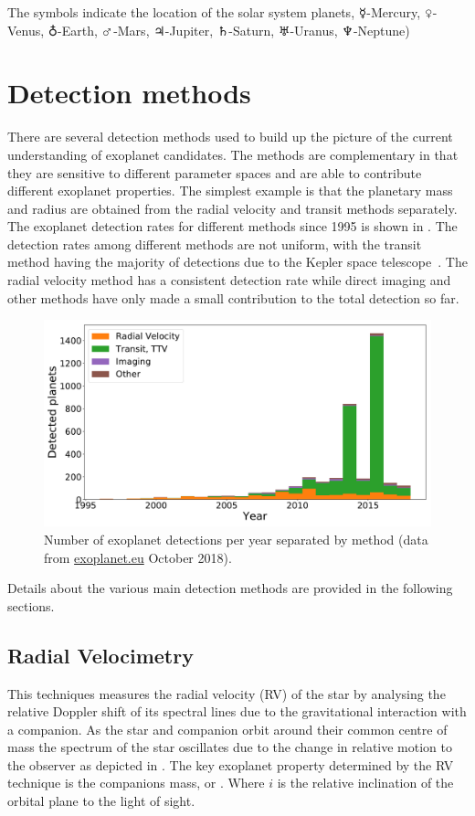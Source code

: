 The symbols indicate the location of the solar system planets, $\mercury$-Mercury, $\venus$-Venus, $\earth$-Earth, $\mars$-Mars, $\jupiter$-Jupiter, $\saturn$-Saturn, $\uranus$-Uranus, $\neptune$-Neptune)


\section{Detection methods}
There are several detection methods used to build up the picture of the current understanding of exoplanet candidates.
The methods are complementary in that they are sensitive to different parameter spaces and are able to contribute different exoplanet properties.
The simplest example is that the planetary mass and radius are obtained from the radial velocity and transit methods separately.
The exoplanet detection rates for different methods since 1995 is shown in .
The detection rates among different methods are not uniform, with the transit method having the majority of detections due to the Kepler space telescope~\citep{borucki_finding_2008}.
The radial velocity method has a consistent detection rate while direct imaging and other methods have only made a small contribution to the total detection so far.

\begin{figure}
    \centering
    \includegraphics[width=0.7\linewidth]{./figures/introduction/exoplanetEU_year_method.pdf}
    \caption{Number of exoplanet detections per year separated by method (data from \href{http://ww.exoplanet.eu}{exoplanet.eu} October 2018).}
    \label{fig:detection_year_method}
\end{figure}


Details about the various main detection methods are provided in the following sections.

\subsection{Radial Velocimetry}
This techniques measures the radial velocity (RV) of the star by analysing the relative Doppler shift of its spectral lines due to the gravitational interaction with a companion.
As the star and companion orbit around their common centre of mass the spectrum of the star oscillates due to the change in relative motion to the observer as depicted in .
The key exoplanet property determined by the RV technique is the companions mass, or \mtwosini.
Where $i$ is the relative inclination of the orbital plane to the light of sight.

